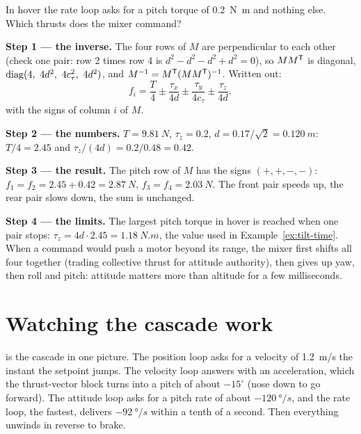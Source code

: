 \begin{example}
\label{ex:cascade-mixer}
In hover the rate loop asks for a pitch torque of \SI{0.2}{N.m} and nothing else. Which thrusts does the mixer command?

\textbf{Step 1 — the inverse.} The four rows of $M$ are perpendicular to each other (check one pair: row 2 times row 4 is $d^2 - d^2 - d^2 + d^2 = 0$), so $MM^{\mathsf{T}}$ is diagonal, $\operatorname{diag}(4,\ 4d^2,\ 4c_\tau^2,\ 4d^2)$, and $M^{-1} = M^{\mathsf{T}}(MM^{\mathsf{T}})^{-1}$. Written out:
\begin{equation*}
  f_i = \frac{T}{4} \pm \frac{\tau_x}{4d} \pm \frac{\tau_y}{4c_\tau} \pm \frac{\tau_z}{4d},
\end{equation*}
with the signs of column $i$ of $M$.

\textbf{Step 2 — the numbers.} $T = \SI{9.81}{N}$, $\tau_z = 0.2$, $d = 0.17/\sqrt2 = \SI{0.120}{m}$: $T/4 = 2.45$ and $\tau_z/(4d) = 0.2/0.48 = 0.42$.

\textbf{Step 3 — the result.} The pitch row of $M$ has the signs $(+, +, -, -)$: $f_1 = f_2 = 2.45 + 0.42 = \SI{2.87}{N}$, $f_3 = f_4 = \SI{2.03}{N}$. The front pair speeds up, the rear pair slows down, the sum is unchanged.

\textbf{Step 4 — the limits.} The largest pitch torque in hover is reached when one pair stops: $\tau_z = 4d \cdot 2.45 = \SI{1.18}{N.m}$, the value used in Example~\ref{ex:tilt-time}. When a command would push a motor beyond its range, the mixer first shifts all four together (trading collective thrust for attitude authority), then gives up yaw, then roll and pitch: attitude matters more than altitude for a few milliseconds.
\end{example}

\section{Watching the cascade work}


 is the cascade in one picture. The position loop asks for a velocity of \SI{1.2}{m/s} the instant the setpoint jumps. The velocity loop answers with an acceleration, which the thrust-vector block turns into a pitch of about $-15^\circ$ (nose down to go forward). The attitude loop asks for a pitch rate of about $\SI{-120}{\degree/s}$, and the rate loop, the fastest, delivers $\SI{-92}{\degree/s}$ within a tenth of a second. Then everything unwinds in reverse to brake.


